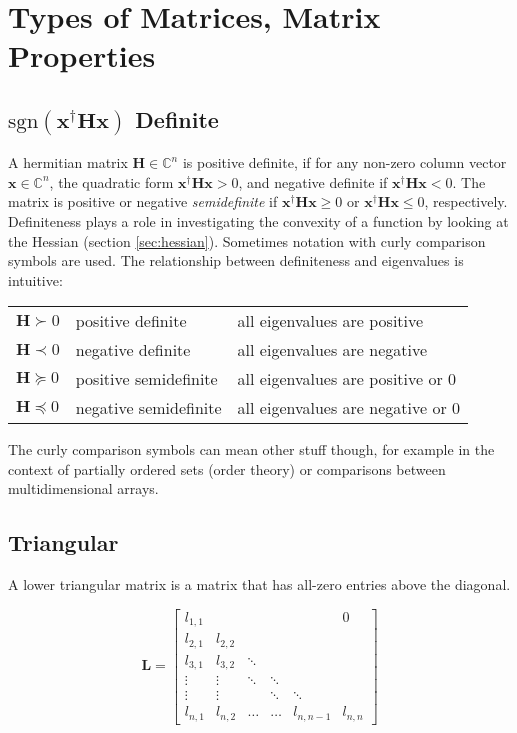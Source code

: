 \section{Types of Matrices, Matrix Properties}

\subsection{$\mathrm{sgn}\left(\mathbf{x}^{\dagger}\mathbf{H}\mathbf{x}\right)$ Definite}
\label{sec:definite}

A hermitian matrix $\mathbf{H}\in\mathbb{C}^n$ is positive definite, if for any non-zero column vector $\mathbf{x}\in\mathbb{C}^n$, the quadratic form $\mathbf{x}^{\dagger}\mathbf{H}\mathbf{x} > 0$, and negative definite if $\mathbf{x}^{\dagger}\mathbf{H}\mathbf{x} < 0$. The matrix is positive or negative \textit{semidefinite} if  $\mathbf{x}^{\dagger}\mathbf{H}\mathbf{x} \geq 0$ or $\mathbf{x}^{\dagger}\mathbf{H}\mathbf{x} \leq 0$, respectively. Definiteness plays a role in investigating the convexity of a function by looking at the Hessian (section \ref{sec:hessian}). Sometimes notation with curly comparison symbols are used. The relationship between definiteness and eigenvalues is intuitive:

\begin{tabular}{lll}
$\mathbf{H} \succ 0$ & positive definite & all eigenvalues are positive\\
$\mathbf{H} \prec 0$ & negative definite & all eigenvalues are negative\\
$\mathbf{H} \succeq 0$ & positive semidefinite & all eigenvalues are positive or 0\\
$\mathbf{H} \preceq 0$ & negative semidefinite & all eigenvalues are negative or 0
\centering
\end{tabular}

The curly comparison symbols can mean other stuff though, for example in the context of partially ordered sets (order theory) or comparisons between multidimensional arrays.





\subsection{Triangular}
\label{sec:triangular}
A lower triangular matrix is a matrix that has all-zero entries above the diagonal.


\begin{equation}
\mathbf{L} = \left[\begin{array}{cccccc} l_{1,1}&&&&&0\\l_{2,1}&l_{2,2}&&&&\\l_{3,1}&l_{3,2}&\ddots&&&\\  \vdots&\vdots&\ddots&\ddots&&\\ \vdots&\vdots&&\ddots&\ddots&\\  l_{n,1}&l_{n,2}&\hdots&\hdots&l_{n,n-1}&l_{n,n}\end{array}\right]
\end{equation}

